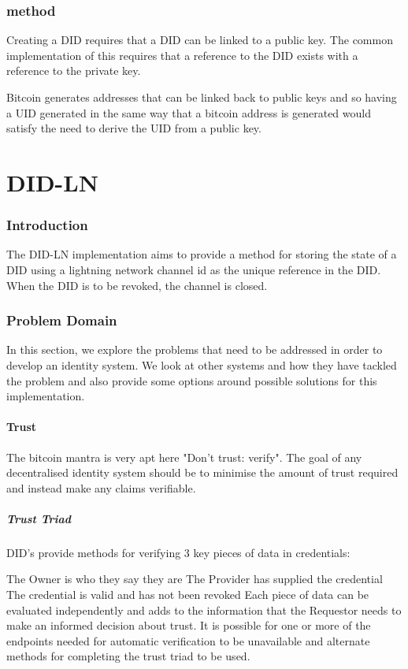 \documentclass[10pt,a4paper]{runcrypto}
\begin{document}
\section{method}
Creating a DID requires that a DID can be linked to a public key.  The common implementation of this requires that a reference to the DID exists with a reference to the private key.

Bitcoin generates addresses that can be linked back to public keys and so having a UID generated in the same way that a bitcoin address is generated would satisfy the need to derive the UID from a public key.

\part{DID-LN}

\section{Introduction}
The DID-LN implementation aims to provide a method for storing the state of a DID using a lightning network channel id as the unique reference in the DID.  When the DID is to be revoked, the channel is closed.

\section{Problem Domain}
In this section, we explore the problems that need to be addressed in order to develop an identity system.  We look at other systems and how they have tackled the problem and also  provide some options around possible solutions for this implementation.

\subsection{Trust}
The bitcoin mantra is very apt here "Don't trust: verify". The goal of any decentralised identity system should be to minimise the amount of trust required and instead make any claims verifiable.

\subsubsection{Trust Triad}

DID's provide methods for verifying 3 key pieces of data in credentials:

    The Owner is who they say they are
    The Provider has supplied the credential
    The credential is valid and has not been revoked Each piece of data can be evaluated independently and adds to the information that the Requestor needs to make an informed decision about trust. It is possible for one or more of the endpoints needed for automatic verification to be unavailable and alternate methods for completing the trust triad to be used.
\end{document}
